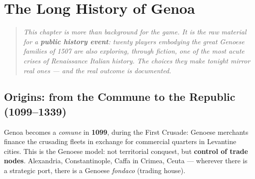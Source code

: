 %

\chapter{The Long History of Genoa}
\label{ch:history-expanded}

\begin{quote}
\itshape
This chapter is more than background for the game. It is the raw material
for a \textbf{public history event}: twenty players embodying the great
Genoese families of 1507 are also exploring, through fiction, one of the
most acute crises of Renaissance Italian history. The choices they make
tonight mirror real ones --- and the real outcome is documented.
\end{quote}

\section{Origins: from the Commune to the Republic (1099--1339)}
\label{sec:origins}


Genoa becomes a \textit{comune} in \textbf{1099}, during the First Crusade:
Genoese merchants finance the crusading fleets in exchange for commercial
quarters in Levantine cities. This is the Genoese model: not territorial
conquest, but \textbf{control of trade nodes}. Alexandria, Constantinople,
Caffa in Crimea, Ceuta --- wherever there is a strategic port, there is a
Genoese \textit{fondaco} (trading house).

